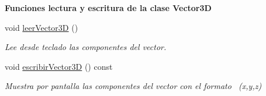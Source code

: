 \begin{Indent}\textbf{ Funciones lectura y escritura de la clase Vector3D}\par
\begin{DoxyCompactItemize}
\item 
void \mbox{\hyperlink{classed_1_1Vector3D_a383b32d61696badf77dac30aca5211a3}{leer\+Vector3D}} ()
\begin{DoxyCompactList}\small\item\em Lee desde teclado las componentes del vector. \end{DoxyCompactList}\item 
void \mbox{\hyperlink{classed_1_1Vector3D_a8aa810ccaca06f0f0a34871433e7235b}{escribir\+Vector3D}} () const
\begin{DoxyCompactList}\small\item\em Muestra por pantalla las componentes del vector con el formato~\newline
 (x,y,z) \end{DoxyCompactList}\end{DoxyCompactItemize}
\end{Indent}
